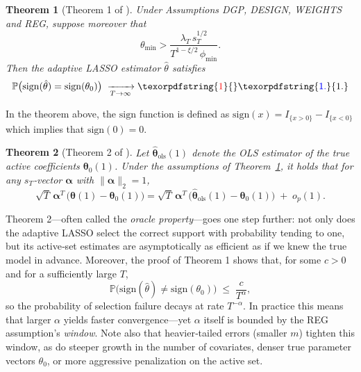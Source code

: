 \documentclass[10pt,a4paper,oneside]{article}
\newcommand{\Prob}{\mathbb{P}}
\newtheorem{theorem}{Theorem}
\providecommand{\DIFaddtex}[1]{{\protect\color{blue} \sf #1}} %
\providecommand{\DIFdeltex}[1]{{\protect\color{red} \scriptsize #1}} %
\providecommand{\DIFaddbegin}{} %
\providecommand{\DIFaddend}{} %
\providecommand{\DIFdelbegin}{} %
\providecommand{\DIFdelend}{} %
\providecommand{\DIFadd}[1]{\texorpdfstring{\DIFaddtex{#1}}{#1}} %
\providecommand{\DIFdel}[1]{\texorpdfstring{\DIFdeltex{#1}}{}} %
\newcommand{\DIFscaledelfig}{0.5}
\newlength{\DIFdelgraphicswidth} %
\newlength{\DIFdelgraphicsheight} %
\newcommand{\DIFaddincludegraphics}[2][]{{\color{blue}\fbox{\DIFOincludegraphics[#1]{#2}}}} %
\newcommand{\DIFdelincludegraphics}[2][]{%
\sbox{\DIFdelgraphicsbox}{\DIFOincludegraphics[#1]{#2}}%
\settoboxwidth{\DIFdelgraphicswidth}{\DIFdelgraphicsbox} %
\settoboxtotalheight{\DIFdelgraphicsheight}{\DIFdelgraphicsbox} %
\scalebox{\DIFscaledelfig}{%
\parbox[b]{\DIFdelgraphicswidth}{\usebox{\DIFdelgraphicsbox}\\[-\baselineskip] \rule{\DIFdelgraphicswidth}{0em}}\llap{\resizebox{\DIFdelgraphicswidth}{\DIFdelgraphicsheight}{%
\setlength{\unitlength}{\DIFdelgraphicswidth}%
\begin{picture}(1,1)%
\thicklines\linethickness{2pt} %
{\color[rgb]{1,0,0}\put(0,0){\framebox(1,1){}}}%
{\color[rgb]{1,0,0}\put(0,0){\line( 1,1){1}}}%
{\color[rgb]{1,0,0}\put(0,1){\line(1,-1){1}}}%
\end{picture}%
}\hspace*{3pt}}} %
} %
\DeclareRobustCommand{\DIFaddbegin}{\DIFOaddbegin \let\includegraphics\DIFaddincludegraphics} %
\DeclareRobustCommand{\DIFaddend}{\DIFOaddend \let\includegraphics\DIFOincludegraphics} %
\DeclareRobustCommand{\DIFdelbegin}{\DIFOdelbegin \let\includegraphics\DIFdelincludegraphics} %
\DeclareRobustCommand{\DIFdelend}{\DIFOaddend \let\includegraphics\DIFOincludegraphics} %
\begin{document}
\begin{theorem}[Theorem 1 of \cite{MEDEIROS2016255}] Under Assumptions \textup{DGP}, \textup{DESIGN}, \textup{WEIGHTS} and \textup{REG}, suppose moreover that
\[
\theta_{\min}
>
\frac{\lambda_T\,s_T^{1/2}}{
  T^{1-\xi/2}\,\phi_{\min}
}.
\]
Then the adaptive LASSO estimator $\hat\theta$ satisfies
\[
\Prob\bigl(\mathrm{sign}(\hat\theta)=\mathrm{sign}(\theta_0)\bigr)
\;\xrightarrow[T \rightarrow \infty]{} \DIFdelbegin \DIFdel{1
}\DIFdelend \DIFaddbegin \DIFadd{1.
}\DIFaddend \]
\label{thm:1_medeiros}
\end{theorem}

In the theorem above, the $\mathrm{sign}$ function is defined as $\mathrm{sign}(x) = I_{\{ x > 0 \}} - I_{\{ x < 0 \}}$ which implies that $\mathrm{sign}(0) = 0$.

\begin{theorem}[Theorem 2 of \cite{MEDEIROS2016255}] Let $\hat{\boldsymbol{\theta}}_{\text{ols}}{(1)}$ denote the OLS estimator of the true active coefficients $\boldsymbol{\theta}_0{(1)}$.  Under the assumptions of Theorem~\ref{thm:1_medeiros}, it holds that for any $s_T$‑vector $\boldsymbol{\alpha}$ with $\|\boldsymbol{\alpha}\|_2=1$,
\[
\sqrt{T}\,\boldsymbol{\alpha}^T\,\bigl(\hat{\boldsymbol{\theta}}{(1)} - \boldsymbol{\theta}_0{(1)}\bigr)
=
\sqrt{T}\,\boldsymbol{\alpha}^T\,\bigl(\hat{\boldsymbol{\theta}}_{\text{ols}}{(1)} - \boldsymbol{\theta}_0{(1)}\bigr)
\;+\;o_p(1).
\]
\end{theorem}

Theorem 2—often called the \textit{oracle property}—goes one step further: not only does the adaptive LASSO select the correct support with probability tending to one, but its active‐set estimates are asymptotically as efficient as if we knew the true model in advance. Moreover, the proof of Theorem 1 shows that, for some $c>0$ and for a sufficiently large \(T\),
\begin{equation}
\Prob\bigl(\mathrm{sign}(\hat\theta)\neq\mathrm{sign}(\theta_0)\bigr)
\;\le\;
\frac{c}{T^\alpha},
\label{eq:decay_rate}
\end{equation}
so the probability of selection failure decays at rate \(T^{-\alpha}\). In practice this means that larger \(\alpha\) yields faster convergence—yet \(\alpha\) itself is bounded by the REG assumption’s \textit{window}. Note also that heavier‐tailed errors (smaller \(m\)) tighten this window, as do steeper growth in the number of covariates, denser true parameter vectors \(\theta_0\), or more aggressive penalization on the active set.
\end{document}
